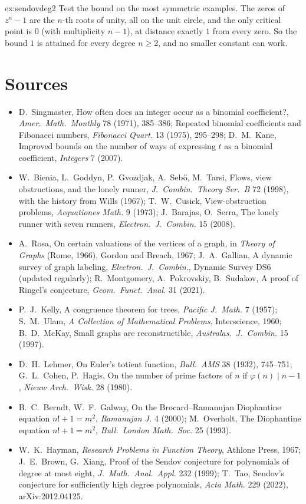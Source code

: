 \begin{solution}{ex:sendovdeg2}
\idea Test the bound on the most symmetric examples.
\writeup The zeros of $z^n-1$ are the $n$-th roots of unity, all on the unit circle, and the only critical point is $0$ (with multiplicity $n-1$), at distance exactly $1$ from every zero. So the bound $1$ is attained for every degree $n\ge2$, and no smaller constant can work.
\end{solution}

\section{Sources}

\begin{itemize}
\item D.~Singmaster, How often does an integer occur as a binomial coefficient?, \emph{Amer.\ Math.\ Monthly} 78 (1971), 385--386; Repeated binomial coefficients and Fibonacci numbers, \emph{Fibonacci Quart.} 13 (1975), 295--298; D.~M.~Kane, Improved bounds on the number of ways of expressing $t$ as a binomial coefficient, \emph{Integers} 7 (2007).
\item W.~Bienia, L.~Goddyn, P.~Gvozdjak, A.~Seb\H o, M.~Tarsi, Flows, view obstructions, and the lonely runner, \emph{J.\ Combin.\ Theory Ser.\ B} 72 (1998), with the history from Wills (1967); T.~W.~Cusick, View-obstruction problems, \emph{Aequationes Math.} 9 (1973); J.~Barajas, O.~Serra, The lonely runner with seven runners, \emph{Electron.\ J.\ Combin.} 15 (2008).
\item A.~Rosa, On certain valuations of the vertices of a graph, in \emph{Theory of Graphs} (Rome, 1966), Gordon and Breach, 1967; J.~A.~Gallian, A dynamic survey of graph labeling, \emph{Electron.\ J.\ Combin.}, Dynamic Survey DS6 (updated regularly); R.~Montgomery, A.~Pokrovskiy, B.~Sudakov, A proof of Ringel's conjecture, \emph{Geom.\ Funct.\ Anal.} 31 (2021).
\item P.~J.~Kelly, A congruence theorem for trees, \emph{Pacific J.\ Math.} 7 (1957); S.~M.~Ulam, \emph{A Collection of Mathematical Problems}, Interscience, 1960; B.~D.~McKay, Small graphs are reconstructible, \emph{Australas.\ J.\ Combin.} 15 (1997).
\item D.~H.~Lehmer, On Euler's totient function, \emph{Bull.\ AMS} 38 (1932), 745--751; G.~L.~Cohen, P.~Hagis, On the number of prime factors of $n$ if $\varphi(n)\mid n-1$, \emph{Nieuw Arch.\ Wisk.} 28 (1980).
\item B.~C.~Berndt, W.~F.~Galway, On the Brocard--Ramanujan Diophantine equation $n!+1=m^2$, \emph{Ramanujan J.} 4 (2000); M.~Overholt, The Diophantine equation $n!+1=m^2$, \emph{Bull.\ London Math.\ Soc.} 25 (1993).
\item W.~K.~Hayman, \emph{Research Problems in Function Theory}, Athlone Press, 1967; J.~E.~Brown, G.~Xiang, Proof of the Sendov conjecture for polynomials of degree at most eight, \emph{J.\ Math.\ Anal.\ Appl.} 232 (1999); T.~Tao, Sendov's conjecture for sufficiently high degree polynomials, \emph{Acta Math.} 229 (2022), arXiv:2012.04125.
\end{itemize}
